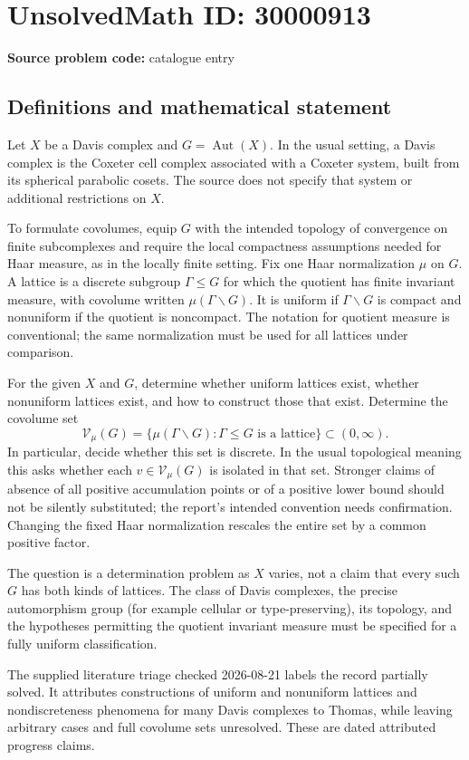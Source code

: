 \documentclass[11pt]{article}
\begin{document}
\section*{UnsolvedMath ID: 30000913}
\textbf{Source problem code:} catalogue entry
\subsection{Definitions and mathematical statement}
Let $X$ be a Davis complex and $G=\operatorname{Aut}(X)$. In the usual setting, a Davis complex is the Coxeter cell complex associated with a Coxeter system, built from its spherical parabolic cosets. The source does not specify that system or additional restrictions on $X$.

To formulate covolumes, equip $G$ with the intended topology of convergence on finite subcomplexes and require the local compactness assumptions needed for Haar measure, as in the locally finite setting. Fix one Haar normalization $\mu$ on $G$. A lattice is a discrete subgroup $\Gamma\leq G$ for which the quotient has finite invariant measure, with covolume written $\mu(\Gamma\backslash G)$. It is uniform if $\Gamma\backslash G$ is compact and nonuniform if the quotient is noncompact. The notation for quotient measure is conventional; the same normalization must be used for all lattices under comparison.

For the given $X$ and $G$, determine whether uniform lattices exist, whether nonuniform lattices exist, and how to construct those that exist. Determine the covolume set
\[
\mathcal V_\mu(G)=
\{\mu(\Gamma\backslash G):\Gamma\leq G\text{ is a lattice}\}
\subset(0,\infty).
\]
In particular, decide whether this set is discrete. In the usual topological meaning this asks whether each $v\in\mathcal V_\mu(G)$ is isolated in that set. Stronger claims of absence of all positive accumulation points or of a positive lower bound should not be silently substituted; the report's intended convention needs confirmation. Changing the fixed Haar normalization rescales the entire set by a common positive factor.

The question is a determination problem as $X$ varies, not a claim that every such $G$ has both kinds of lattices. The class of Davis complexes, the precise automorphism group (for example cellular or type-preserving), its topology, and the hypotheses permitting the quotient invariant measure must be specified for a fully uniform classification.

The supplied literature triage checked 2026-08-21 labels the record partially solved. It attributes constructions of uniform and nonuniform lattices and nondiscreteness phenomena for many Davis complexes to Thomas, while leaving arbitrary cases and full covolume sets unresolved. These are dated attributed progress claims.
\end{document}
